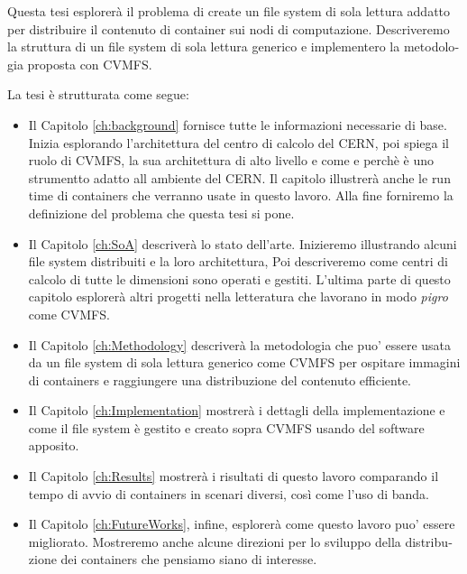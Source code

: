 \begin{otherlanguage}{italian}
Questa tesi esplorerà il problema di create un file system di sola lettura
        addatto per distribuire il contenuto di container sui nodi di
        computazione. Descriveremo la struttura di un file system di sola
        lettura generico e implementero la metodologia proposta con CVMFS.

La tesi è strutturata come segue: 

\begin{itemize} 
        
        \item Il Capitolo \ref{ch:background} fornisce tutte le informazioni
                necessarie di base. Inizia esplorando l'architettura del centro
                di calcolo del CERN, poi spiega il ruolo di CVMFS, la sua
                architettura di alto livello e come e perchè è uno strumentto
                adatto all ambiente del CERN.  Il capitolo illustrerà anche le
                run time di containers che verranno usate in questo lavoro.
                Alla fine forniremo la definizione del problema che questa tesi
                si pone.  
        
        \item Il Capitolo \ref{ch:SoA} descriverà lo stato dell'arte.
                Inizieremo illustrando alcuni file system distribuiti e la loro
                architettura, Poi descriveremo come centri di calcolo di tutte
                le dimensioni sono operati e gestiti. L'ultima parte di questo
                capitolo esplorerà altri progetti nella letteratura che
                lavorano in modo \textit{pigro} come CVMFS.

        \item Il Capitolo \ref{ch:Methodology} descriverà la metodologia che
                puo' essere usata da un file system di sola lettura generico
                come CVMFS per ospitare immagini di containers e raggiungere
                una distribuzione del contenuto efficiente.

        \item Il Capitolo \ref{ch:Implementation} mostrerà i dettagli della
                implementazione e come il file system è gestito e creato sopra
                CVMFS usando del software apposito.
                
        \item Il Capitolo \ref{ch:Results} mostrerà i risultati di questo
                lavoro comparando il tempo di avvio di containers in scenari
                diversi, così come l'uso di banda.

        \item Il Capitolo \ref{ch:FutureWorks}, infine, esplorerà come questo
                lavoro puo' essere migliorato. Mostreremo anche alcune
                direzioni per lo sviluppo della distribuzione dei containers
                che pensiamo siano di interesse.

\end{itemize}




\end{otherlanguage}

\endgroup

\vfill
